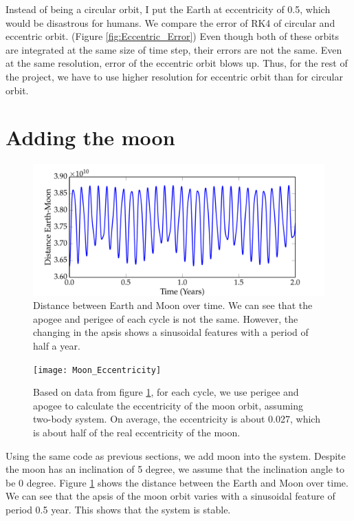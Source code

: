 \documentclass[11pt,letterpaper]{article}
\begin{document}
Instead of being a circular orbit, I put the Earth at eccentricity of 0.5, which would be disastrous for humans. We compare the error of RK4 of circular and eccentric orbit. (Figure \ref{fig:Eccentric_Error}) Even though both of these orbits are integrated at the same size of time step, their errors are not the same. Even at the same resolution, error of the eccentric orbit blows up. Thus, for the rest of the project, we have to use higher resolution for eccentric orbit than for circular orbit.

\section{Adding the moon}

\begin{figure}[h!]
	\centering
	\includegraphics[height = 0.3\textheight]{Moon_Apsis}
	\caption{Distance between Earth and Moon over time. We can see that the apogee and perigee of each cycle is not the same. However, the changing in the apsis shows a sinusoidal features with a period of half a year.}
	\label{fig:Moon_Apsis}
\end{figure}

\begin{figure}[h!]
	\centering
	\texttt{[image: Moon\_Eccentricity]}
	\caption{Based on data from figure \ref{fig:Moon_Apsis}, for each cycle, we use perigee and apogee to calculate the eccentricity of the moon orbit, assuming two-body system. On average, the eccentricity is about 0.027, which is about half of the real eccentricity of the moon.}
	\label{fig:Moon_Eccentricity}
\end{figure}

Using the same code as previous sections, we add moon into the system. Despite the moon has an inclination of 5 degree, we assume that the inclination angle to be 0 degree. Figure \ref{fig:Moon_Apsis} shows the distance between the Earth and Moon over time. We can see that the apsis of the moon orbit varies with a sinusoidal feature of period 0.5 year. This shows that the system is stable.
\end{document}
